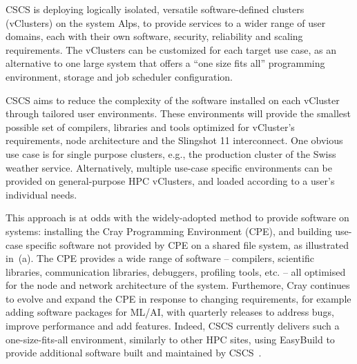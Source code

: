 CSCS is deploying logically isolated, versatile software-defined clusters (vClusters)\cite{vClusters2023} on the \crayex system Alps, to provide services to a wider range of user domains, each with their own software, security, reliability and scaling requirements.
The vClusters can be customized for each target use case, as an alternative to one large system that offers a ``one size fits all'' programming environment, storage and job scheduler configuration.

CSCS aims to reduce the complexity of the software installed on each vCluster through tailored user environments.
These environments will provide the smallest possible set of compilers, libraries and tools optimized for vCluster's requirements, node architecture and the Slingshot 11 interconnect.
One obvious use case is for single purpose clusters, e.g., the production cluster of the Swiss weather service.
Alternatively, multiple use-case specific environments can be provided on general-purpose HPC vClusters, and loaded according to a user's individual needs.

This approach is at odds with the widely-adopted method to provide software on \crayex systems: installing the Cray Programming Environment (CPE), and building use-case specific software not provided by CPE on a shared file system, as illustrated in~(a).
The CPE provides a wide range of software -- compilers, scientific libraries, communication libraries, debuggers, profiling tools, etc. -- all optimised for the node and network architecture of the system.
Furthemore, Cray continues to evolve and expand the CPE in response to changing requirements, for example adding software packages for ML/AI, with quarterly releases to address bugs, improve performance and add features.
Indeed, CSCS currently delivers such a one-size-fits-all environment, similarly to other HPC sites, using EasyBuild to provide additional software built and maintained by CSCS~\cite{forai:cug16}.

